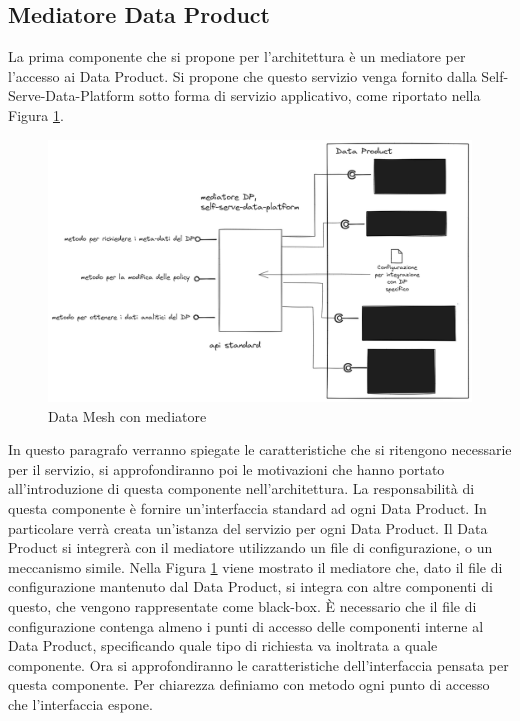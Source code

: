 \documentclass[12pt]{report}
\begin{document}
\subsection{Mediatore Data Product}
La prima componente che si propone per l'architettura è un mediatore per l'accesso ai Data Product.
Si propone che questo servizio venga fornito dalla Self-Serve-Data-Platform sotto forma di servizio applicativo, come riportato nella Figura \ref{fig:dp solo mediatore}.
\begin{figure}
    \centering
    \includegraphics[width=\linewidth]{immagini/Data mesh con interfaccie.png}
    \caption{Data Mesh con mediatore}
    \label{fig:dp solo mediatore}
\end{figure}
In questo paragrafo verranno spiegate le caratteristiche che si ritengono necessarie per il servizio, si approfondiranno poi le motivazioni che hanno portato all'introduzione di questa componente nell'architettura.
La responsabilità di questa componente è fornire un'interfaccia standard ad ogni Data Product.
In particolare verrà creata un'istanza del servizio per ogni Data Product.
Il Data Product si integrerà con il mediatore utilizzando un file di configurazione, o un meccanismo simile.
Nella Figura \ref{fig:dp solo mediatore}  viene mostrato il mediatore che, dato il file di configurazione mantenuto dal Data Product, si integra con altre componenti di questo, che vengono rappresentate come black-box.
È necessario che il file di configurazione contenga almeno i punti di accesso delle componenti interne al Data Product, specificando quale tipo di richiesta va inoltrata a quale componente.
Ora si approfondiranno le caratteristiche  dell'interfaccia pensata per questa componente.
Per chiarezza definiamo con metodo ogni punto di accesso che l'interfaccia espone.
\end{document}
